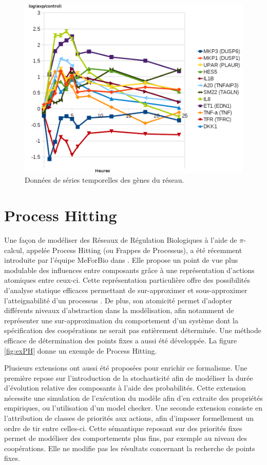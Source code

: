\begin{figure}[p]
\includegraphics[scale=0.5]{images/12genes.png}
\caption{\label{fig:12genes}
Données de séries temporelles des gènes du réseau.
}
\end{figure}


\section{Process Hitting}\label{sec:PH}
Une façon de modéliser des Réseaux de Régulation Biologiques à l'aide de $\pi$-calcul, appelée Process Hitting (ou Frappes de Processus), a été récemment introduite par l'équipe MeForBio
dans \cite{PMR10-TCSB,PaulevePhD}.
Elle propose un point de vue plus modulable des influences entre composants grâce à une représentation d'actions atomiques entre ceux-ci.
Cette représentation particulière offre des possibilités d'analyse statique efficaces permettant de sur-approximer et sous-approximer l'atteignabilité d'un processus \cite{PMR12-MSCS}.
De plus, son atomicité permet d'adopter différents niveaux d'abstraction dans la modélisation, afin notamment de représenter une sur-approximation du comportement d'un système dont la spécification des coopérations ne serait pas entièrement déterminée.
Une méthode efficace de détermination des points fixes a aussi été développée.
La figure \ref{fig:exPH} donne un exemple de Process Hitting.

Plusieurs extensions ont aussi été proposées pour enrichir ce formalisme.
Une première repose sur l'introduction de la stochasticité afin de modéliser la durée d'évolution relative des composants à l'aide des probabilités.
Cette extension nécessite une simulation de l'exécution du modèle afin d'en extraite des propriétés empiriques, ou l'utilisation d'un model checker.
Une seconde extension consiste en l'attribution de classes de priorités aux actions, afin d'imposer formellement un ordre de tir entre celles-ci.
Cette sémantique reposant sur des priorités fixes permet de modéliser des comportements plus fins, par exemple au niveau des coopérations.
Elle ne modifie pas les résultats concernant la recherche de points fixes.

